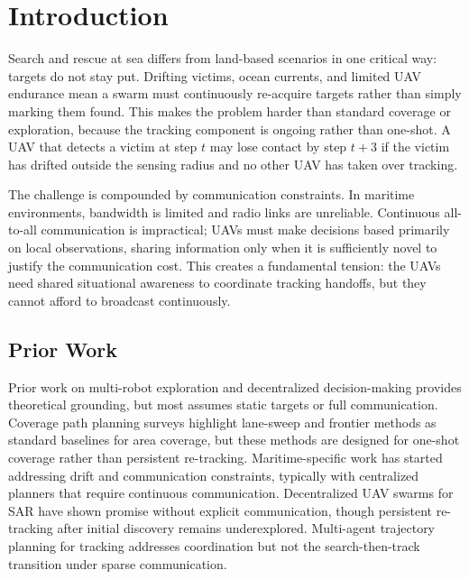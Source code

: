 \documentclass[journal]{IEEEtran}
\begin{document}
\section{Introduction}
\label{sec:intro}

Search and rescue at sea differs from land-based scenarios in one critical way:
targets do not stay put. Drifting victims, ocean currents, and limited UAV endurance
mean a swarm must continuously re-acquire targets rather than simply marking them
found. This makes the problem harder than standard coverage or exploration, because
the tracking component is ongoing rather than one-shot. A UAV that detects a victim
at step $t$ may lose contact by step $t{+}3$ if the victim has drifted outside the
sensing radius and no other UAV has taken over tracking.

The challenge is compounded by communication constraints. In maritime environments,
bandwidth is limited and radio links are unreliable. Continuous all-to-all
communication is impractical; UAVs must make decisions based primarily on local
observations, sharing information only when it is sufficiently novel to justify the
communication cost. This creates a fundamental tension: the UAVs need shared
situational awareness to coordinate tracking handoffs, but they cannot afford to
broadcast continuously.

\subsection{Prior Work}

Prior work on multi-robot exploration \cite{frontier_exploration} and decentralized
decision-making \cite{decentralized_pomdp} provides theoretical grounding, but most
assumes static targets or full communication. Coverage path planning surveys
\cite{coverage_path_planning} highlight lane-sweep and frontier methods as standard
baselines for area coverage, but these methods are designed for one-shot coverage
rather than persistent re-tracking. Maritime-specific work \cite{maritime_tracking,
uav_maritime_review, marine_multirobot_comm}
has started addressing drift and communication constraints, typically with centralized
planners that require continuous communication. Decentralized UAV swarms for SAR \cite{sar_swarms} have
shown promise without explicit communication, though persistent re-tracking after
initial discovery remains underexplored. Multi-agent trajectory planning for tracking
\cite{multi_robot_tracking} addresses coordination but not the search-then-track
transition under sparse communication.
\end{document}
